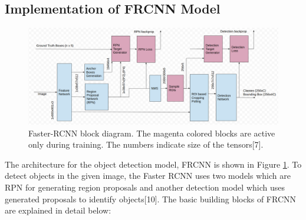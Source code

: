 \documentclass[12pt]{article}
\begin{document}
\subsection{Implementation of FRCNN Model}
\label{sec:FRCNN_impl}
\begin{figure}[H]
\centering
  \includegraphics[width=\linewidth]{./Images/FRCNN_model.png}
  \caption{Faster-RCNN block diagram. The magenta colored blocks are active only during training. The numbers indicate size of the tensors[7].}
  \label{fig:FRCNN_model}
\end{figure}


The architecture for the object detection model, FRCNN is shown in Figure \ref{fig:FRCNN_model}. To detect objects in the given image, the Faster RCNN uses two models which are RPN for generating region proposals and another detection model which uses generated proposals to identify objects[10]. The basic building blocks of FRCNN are explained in detail below: \\
\end{document}
